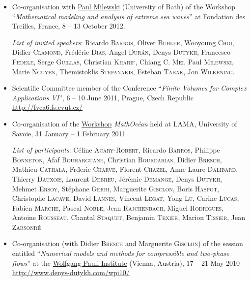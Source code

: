 \documentclass[final, a4paper, oneside, 12pt]{article}
\numberwithin{equation}{section}
\begin{document}
\begin{itemize}
  \item Co-organisation with \href{http://people.bath.ac.uk/pam28/Paul_Milewski,_Professor_of_Mathematics,_University_of_Bath/Milewski.html}{Paul Milewski} (University of Bath) of the Workshop ``\textit{Mathematical modeling and analysis of extreme sea waves}'' at Fondation des Treilles, France, 8 -- 13 October 2012.
  
  \textit{List of invited speakers}: Ricardo \textsc{Barros}, Oliver \textsc{B\"uhler}, Wooyoung \textsc{Choi}, Didier \textsc{Clamond}, Fr\'ed\'eric \textsc{Dias}, Angel \textsc{Dur\'an}, Denys \textsc{Dutykh}, Francesco \textsc{Fedele}, Serge \textsc{Guillas}, Christian \textsc{Kharif}, Chiang C. \textsc{Mei}, Paul \textsc{Milewski}, Marie \textsc{Nguyen}, Themistoklis \textsc{Stefanakis}, Esteban \textsc{Tabak}, Jon \textsc{Wilkening}.

  \item Scientific Committee member of the Conference ``\textit{Finite Volumes for Complex Applications VI}'', 6 -- 10 June 2011, Prague, Czech Republic \\
  \url{http://fvca6.fs.cvut.cz/}
  
  \item Co-organisation of the \href{http://www.lama.univ-savoie.fr/MathOcean/}{Workshop} \textit{MathOc\'ean} held at LAMA, University of Savoie, 31 January -- 1 February 2011
  
  \textit{List of participants}: C\'eline \textsc{Acary-Robert}, Ricardo \textsc{Barros}, Philippe \textsc{Bonneton}, Afaf \textsc{Bouharguane}, Christian \textsc{Bourdarias}, Didier \textsc{Bresch}, Mathieu \textsc{Cathala}, Fr\'deric \textsc{Charve}, Florent \textsc{Chazel}, Anne-Laure \textsc{Dalibard}, Thierry \textsc{Dauxois}, Laurent \textsc{Debreu}, J\'er\'emie \textsc{Demange}, Denys \textsc{Dutykh}, Mehmet \textsc{Ersoy}, St\'ephane \textsc{Gerbi}, Marguerite \textsc{Gisclon}, Boris \textsc{Haspot}, Christophe \textsc{Lacave}, David \textsc{Lannes}, Vincent \textsc{Legat}, Yong \textsc{Lu}, Carine \textsc{Lucas}, Fabien \textsc{Marche}, Pascal \textsc{Noble}, Jean \textsc{Rajchenbach}, Miguel \textsc{Rodrigues}, Antoine \textsc{Rousseau}, Chantal \textsc{Staquet}, Benjamin \textsc{Texier}, Marion \textsc{Tissier}, Jean \textsc{Zabsonr\'e}

  \item Co-organisation (with Didier \textsc{Bresch} and Marguerite \textsc{Gisclon}) of the session entitled ``\textit{Numerical models and methods for compressible and two-phase flows}'' at the \href{http://www.wpi.ac.at/}{Wolfgang Pauli Institute} (Vienna, Austria), 17 -- 21 May 2010 \\
  \url{http://www.denys-dutykh.com/wpi10/}
  

\end{itemize}
\end{document}
